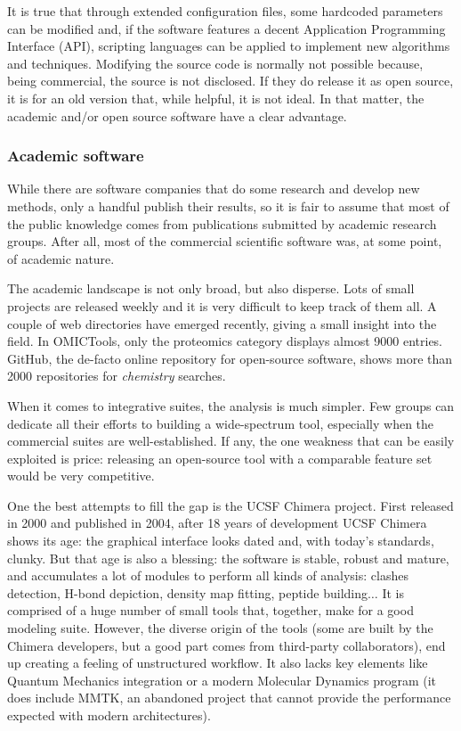 It is true that through extended configuration files, some hardcoded parameters can be modified and, if the software features a decent Application Programming Interface (API), scripting languages can be applied to implement new algorithms and techniques. Modifying the source code is normally not possible because, being commercial, the source is not disclosed. If they do release it as open source, it is for an old version that, while helpful, it is not ideal.\cite{delano2002pymol} In that matter, the academic and/or open source software have a clear advantage.

\subsubsection{Academic software}
While there are software companies that do some research and develop new methods, only a handful publish their results, so it is fair to assume that most of the public knowledge comes from publications submitted by academic research groups. After all, most of the commercial scientific software was, at some point, of academic nature.\cite{gaussian,schrodingerpymol}

The academic landscape is not only broad, but also disperse. Lots of small projects are released weekly and it is very difficult to keep track of them all. A couple of web directories have emerged recently,\cite{omictools,pirhadi2016open} giving a small insight into the field. In OMICTools, only the proteomics category displays almost 9000 entries. GitHub,\cite{github} the de-facto online repository for open-source software, shows more than 2000 repositories for \textit{chemistry} searches.

When it comes to integrative suites, the analysis is much simpler. Few groups can dedicate all their efforts to building a wide-spectrum tool, especially when the commercial suites are well-established. If any, the one weakness that can be easily exploited is price: releasing an open-source tool with a comparable feature set would be very competitive.

One the best attempts to fill the gap is the UCSF Chimera project. First released in 2000\cite{firstchimera} and published in 2004,\cite{chimera} after 18 years of development UCSF Chimera shows its age: the graphical interface looks dated and, with today's standards, clunky. But that age is also a blessing: the software is stable, robust and mature, and accumulates a lot of modules to perform all kinds of analysis: clashes detection, H-bond depiction, density map fitting, peptide building$ \ldots $  It is comprised of a huge number of small tools that, together, make for a good modeling suite. However, the diverse origin of the tools (some are built by the Chimera developers, but a good part comes from third-party collaborators), end up creating a feeling of unstructured workflow. It also lacks key elements like Quantum Mechanics integration or a modern Molecular Dynamics program (it does include MMTK, an abandoned project that cannot provide the performance expected with modern architectures).

